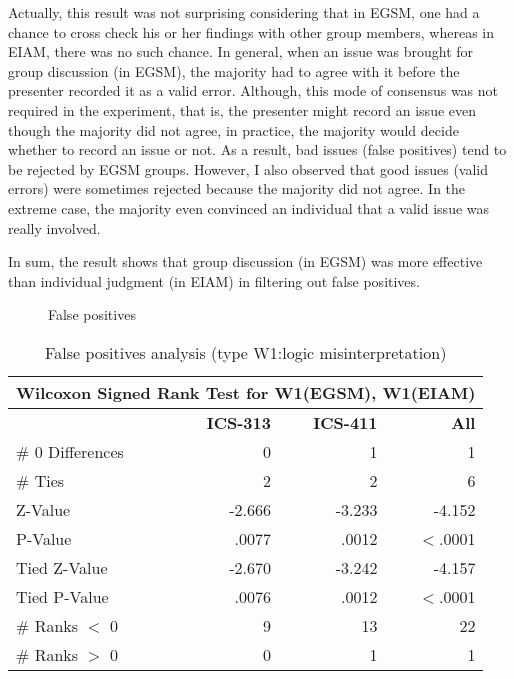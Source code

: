 Actually, this result was not surprising considering that in EGSM, one
had a chance to 
cross check his or her findings with other group members, whereas in EIAM,
there was no such chance. 
In general, when an issue was brought for  group discussion (in
EGSM), the majority had to agree with it before the presenter recorded
it as a valid error. Although, this mode of consensus was not required
in the experiment, that is, the presenter might record an issue
even though the majority did not agree, in practice, the majority
 would decide whether to record an issue or not. As a result,
bad issues (false positives) tend to be rejected  by EGSM groups.
However, I also observed that good issues
(valid errors) were sometimes rejected because the majority did not
agree.  In the extreme case, the majority even  
convinced an individual that a valid issue was really involved.


In sum, the result shows that group discussion (in EGSM) was more
effective than individual judgment (in EIAM) in filtering out false
positives. 

\begin{figure}[htb]
 {\centerline{}}
 \caption{False positives}
 \label{false-positives}
\end{figure}

\begin{table}[htb]
 \caption{False positives analysis (type W1:logic misinterpretation)}
 \begin{center}
 \begin{tabular}{|l|r|r|r|}
  \hline
  \multicolumn{4}{|c|}{\bf Wilcoxon Signed Rank Test for W1(EGSM), W1(EIAM)}\\
  \hline
  & {\bf ICS-313} & {\bf ICS-411} & {\bf All} \\ 
  \hline
  \# 0 Differences & 0      & 1 & 1\\
  \# Ties          & 2      & 2 & 6\\
  Z-Value          & -2.666 & -3.233 & -4.152\\
  P-Value          & .0077  & .0012 & $<$.0001\\
  Tied Z-Value     & -2.670 & -3.242 & -4.157\\
  Tied P-Value     & .0076  & .0012 & $<$.0001\\
  \# Ranks $<$ 0   & 9      & 13 & 22\\
  \# Ranks $>$ 0   & 0      & 1 & 1\\
  \hline
     \end{tabular}
  \end{center}
  \label{false-positives-analysis}
\end{table} 


